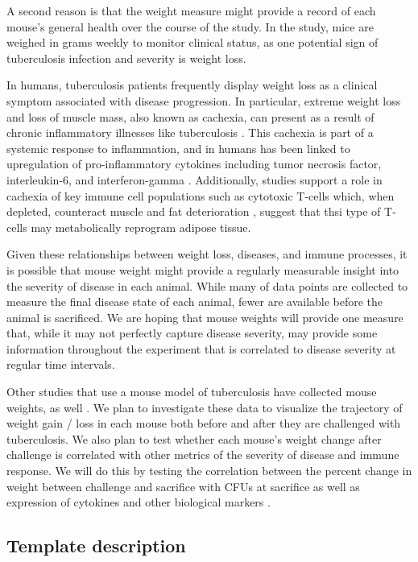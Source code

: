 \documentclass[
]{book}
\begin{document}
A second reason is that the weight measure might provide a record of each
mouse's general health over the course of the study. In the study, mice are
weighed in grams weekly to monitor clinical status, as one potential sign of
tuberculosis infection and severity is weight loss.

In humans, tuberculosis patients frequently display weight loss as a clinical
symptom associated with disease progression. In particular, extreme weight loss
and loss of muscle mass, also known as cachexia, can present as a result of
chronic inflammatory illnesses like tuberculosis \citep{baazim2022interplay}. This
cachexia is part of a systemic response to inflammation, and in humans has been
linked to upregulation of pro-inflammatory cytokines including tumor necrosis
factor, interleukin-6, and interferon-gamma \citep{baazim2022interplay}.
Additionally, studies support a role in cachexia of key immune cell populations
such as cytotoxic T-cells which, when depleted, counteract muscle and fat
deterioration \citep{baazim2019cd8}, suggest that thsi type of T-cells may
metabolically reprogram adipose tissue.

Given these relationships between weight loss, diseases, and immune processes,
it is possible that mouse weight might provide a regularly measurable insight
into the severity of disease in each animal. While many of data points
are collected to measure the final disease state of each animal, fewer are
available before the animal is sacrificed. We are hoping that mouse weights
will provide one measure that, while it may not perfectly capture disease
severity, may provide some information throughout the experiment that is
correlated to disease severity at regular time intervals.

Other studies that use a mouse model of tuberculosis have collected mouse
weights, as well \citep{smith2022host, segueni2016controlled}. We plan to
investigate these data to visualize the trajectory of weight gain / loss in
each mouse both before and after they are challenged with tuberculosis.
We also plan to test whether each mouse's weight change after challenge
is correlated with other metrics of the severity of disease and immune response.
We will do this by testing the correlation between the percent change in
weight between challenge and sacrifice with CFUs at sacrifice as well as
expression of cytokines and other biological markers \citep{smith2022host}.

\subsection{Template description}\label{template-description}
\end{document}
